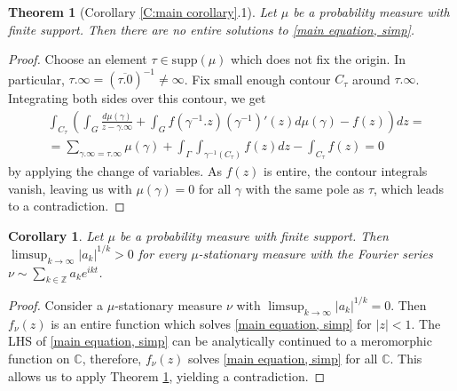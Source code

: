 \documentclass[11pt]{article}
\newtheorem{theorem}{Theorem}[section]
\newtheorem{corollary}{Corollary}[section]
\begin{document}
\begin{theorem}[Corollary \ref{C:main corollary}.1]
	\label{entire solutions}
	Let $\mu$ be a probability measure with finite support. Then there are no entire solutions to \eqref{main equation, simp}.
\end{theorem}
\begin{proof}
	Choose an element $\tau \in \text{supp}(\mu)$ which does not fix the origin. In particular, $\tau.\infty = (\overline{\tau.0})^{-1} \ne \infty$. Fix small enough contour $C_\tau$ around $\tau.\infty$. Integrating both sides over this contour, we get
	\[
	\begin{aligned}
		& \int_{C_\tau}\left( \int_G \frac{d\mu(\gamma)}{z - \gamma.\infty}  + \int_G f(\gamma^{-1}.z)(\gamma^{-1})'(z)  d\mu(\gamma) - f(z) \right) dz = \\ 
		&= \sum_{\gamma.\infty = \tau.\infty} \mu(\gamma) + \int_\Gamma \int_{\gamma^{-1}(C_\tau)} f(z) dz - \int_{C_\tau} f(z)  = 0
	\end{aligned}
	\]
	by applying the change of variables. As $f(z)$ is entire, the contour integrals vanish, leaving us with $\mu(\gamma) = 0$ for all $\gamma$ with the same pole as $\tau$, which leads to a contradiction.
\end{proof}

\begin{corollary}
	Let $\mu$ be a probability measure with finite support. Then $\limsup_{k \rightarrow \infty} |a_k|^{1/k} > 0$ for every $\mu$-stationary measure with the Fourier series $\nu \sim \sum_{k \in \mathbb{Z}} a_k e^{i k t}$.
\end{corollary}
\begin{proof}
	Consider a $\mu$-stationary measure $\nu$ with $\limsup_{k \rightarrow \infty} |a_k|^{1/k} = 0$. Then $f_\nu(z)$ is an entire function which solves \eqref{main equation, simp} for $|z| < 1$. The LHS of \eqref{main equation, simp} can be analytically continued to a meromorphic function on $\mathbb{C}$, therefore, $f_\nu(z)$ solves \eqref{main equation, simp} for all $\mathbb{C}$. This allows us to apply Theorem \ref{entire solutions}, yielding a contradiction.
\end{proof}


\end{document}
